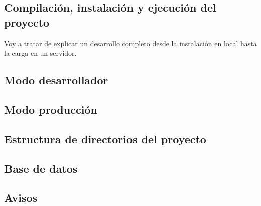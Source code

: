 \subsection{Compilación, instalación y ejecución del proyecto}
Voy a tratar de explicar un desarrollo completo desde la instalación en local hasta la carga en un servidor. 


\subsection{Modo desarrollador }

\subsection{Modo producción}

\subsection{Estructura de directorios del proyecto}

\subsection{Base de datos}




\subsection{Avisos}


